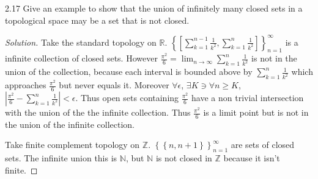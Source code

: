 \documentclass{article}
\newcommand{\R}{\mathbb{R}}
\newcommand{\Z}{\mathbb{Z}}
\newcommand{\N}{\mathbb{N}}
\newcommand{\abs}[1]{\left\lvert #1\right\rvert}
\newenvironment{solution}
{\renewcommand\qedsymbol{$\blacksquare$}\begin{proof}[Solution]}
{\end{proof}}
\begin{document}
\begin{PROB}{2.17}\label{Problem 2.17.}
    Give an example to show that the union of infinitely many closed sets in a topological space may be a set that is not closed.
\end{PROB}
\begin{solution}
    Take the standard topology on $\R$. $\left\{ \left[\sum_{k = 1}^{n - 1} \frac{1}{k^2}, \sum_{k = 1}^{n} \frac{1}{k^2}\right] \right\}_{n = 1}^{\infty}$ is a infinite collection of closed sets. However $\frac{\pi^2}{6} = \lim_{n \to \infty} \sum_{k = 1}^{n} \frac{1}{k^2}$ is not in the union of the collection, because each interval is bounded above by $\sum_{k = 1}^{n} \frac{1}{k^2}$ which approaches $\frac{\pi^2}{6}$ but never equals it. Moreover $\forall \epsilon$, $\exists K \ni \forall n 
    \geq K$, $\abs{ \frac{\pi^2}{6} - \sum_{k = 1}^{n} \frac{1}{k^2} } < \epsilon$. Thus open sets containing $\frac{\pi^2}{6}$ have a non trivial intersection with the union of the the infinite collection. Thus $\frac{\pi^2}{6}$ is a limit point but is not in the union of the infinite collection.     
    
    
    Take finite complement topology on $\Z$. $\left\{ \left\{ n, n+1 \right\} \right\}_{n = 1}^{\infty}$ are sets of closed sets. The infinite union this is $\N$, but $\N$ is not closed in $\Z$ because it isn't finite.   
\end{solution}

\bigskip
\end{document}
